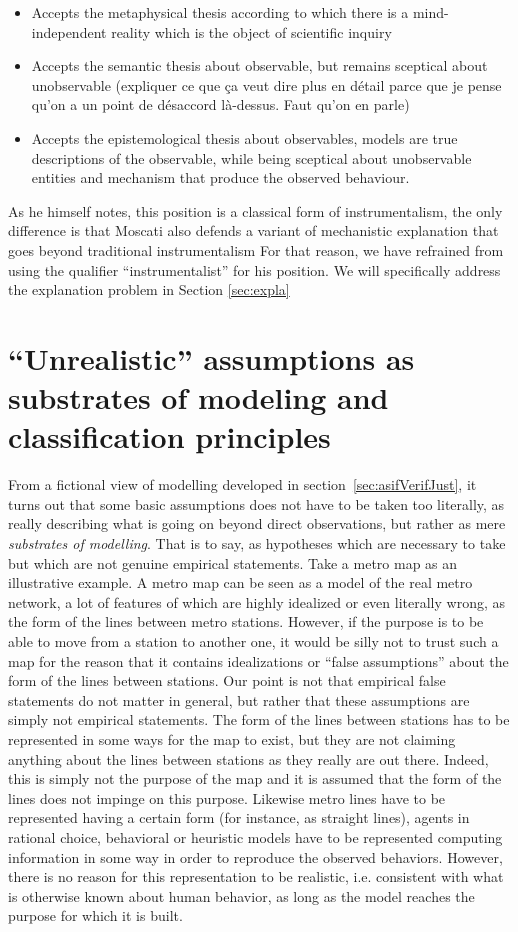 \documentclass[a4paper,11pt]{article}
\theoremstyle{definition}
\begin{document}
\begin{itemize}
    \item Accepts the metaphysical thesis according to which there is a mind-independent reality which is the object of scientific inquiry
    \item Accepts the semantic thesis about observable, but remains sceptical about unobservable (expliquer ce que ça veut dire plus en détail parce que je pense qu'on a un point de désaccord là-dessus. Faut qu'on en parle)
    \item Accepts the epistemological thesis about observables, models are true descriptions of the observable, while being sceptical about unobservable entities and mechanism that produce the observed behaviour.
\end{itemize}

As he himself notes, this position is a classical form of instrumentalism, the only difference is that Moscati also defends a variant of mechanistic explanation that goes beyond traditional instrumentalism For that reason, we have refrained from using the qualifier ``instrumentalist'' for his position. We will specifically address the explanation problem in Section \ref{sec:expla}


\section{``Unrealistic'' assumptions as substrates of modeling and classification principles}
\label{sec:epistemo_criterion}
From a fictional view of modelling developed in section~\ref{sec:asifVerifJust}, it turns out that some basic assumptions does not have to be taken too literally, as really describing what is going on beyond direct observations, but rather as mere \textit{substrates of modelling}. That is to say, as hypotheses which are necessary to take but which are not genuine empirical statements. Take a metro map as an illustrative example. A metro map can be seen as a model of the real metro network, a lot of features of which are highly idealized or even literally wrong, as the form of the lines between metro stations. However, if the purpose is to be able to move from a station to another one, it would be silly not to trust such a map for the reason that it contains idealizations or ``false assumptions'' about the form of the lines between stations. Our point is not that empirical false statements do not matter in general, but rather that these assumptions are simply not empirical statements. The form of the lines between stations has to be represented in some ways for the map to exist, but they are not claiming anything about the lines between stations as they really are out there. Indeed, this is simply not the purpose of the map and it is assumed that the form of the lines does not impinge on this purpose. Likewise metro lines have to be represented having a certain form (for instance, as straight lines), agents in rational choice, behavioral or heuristic models have to be represented computing information in some way in order to reproduce the observed behaviors. However, there is no reason for this representation to be realistic, i.e. consistent with what is otherwise known about human behavior, as long as the model reaches the purpose for which it is built. 
\end{document}
